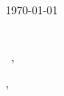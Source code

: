 \documentclass[12pt]{letter}
\begin{document}
\AddToShipoutPictureBG{%
\color{gr}
\AtPageUpperLeft{\rule[-1.3in]{\paperwidth}{1.3in}}
}

\begin{adjustwidth}{0.5in}{0.5in}
\begin{center}
{\fontsize{28}{0}\selectfont\scshape \myname}

\href{mailto:\myemail}{\faEnvelope\enspace \myemail}\hfill
\href{tel:\myphone}{\faPhone\enspace \myphone}\hfill
\faMapMarker\enspace \mylocation
\end{center}
\end{adjustwidth}

\vspace{0.2in}

\today\\

\vspace{-0.1in}\recipient\\
\company\\

\vspace{-0.1in}\greeting\ \recipient,\\

\vspace{-0.1in}\setlength\parindent{24pt}
\noindent

\vspace{0.1in}
\vfill

\begin{flushright}
\closer,

\myname\\
\mytitle
\end{flushright}
\end{document}
